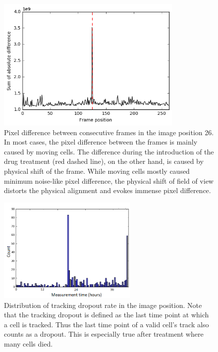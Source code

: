\documentclass[pdftex,12pt,a4paper]{report}
\begin{document}
\begin{figure}[H]
\centering
\includegraphics[width=0.8\textwidth]{images/pixdiff}
\caption[Slice-wise sum of pixel difference in a stack]{Pixel difference between consecutive frames in the image position 26. In most cases, the pixel difference between the frames is mainly caused by moving cells. The difference during the introduction of the drug treatment (red dashed line), on the other hand, is caused by physical shift of the frame. While moving cells mostly caused minimum noise-like pixel difference, the physical shift of field of view distorts the physical alignment and evokes immense pixel difference.}
\label{fig:pixdiff}
\end{figure}

\begin{figure}[H]
\centering
\includegraphics[width=0.6\textwidth]{images/dropout.png}
\caption[Tracking dropout rate]{Distribution of tracking dropout rate in the image position. Note that the tracking dropout is defined as the last time point at which a cell is tracked. Thus the last time point of a valid cell's track also counts as a dropout. This is especially true after treatment where many cells died.}
\label{fig:dropout_rate}
\end{figure}
\end{document}
